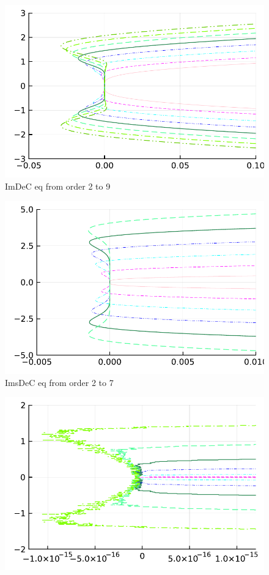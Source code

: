 \begin{figure}
	\begin{minipage}[t]{0.325\textwidth}
		\includegraphics[width=\textwidth]{pdf/odepics/IMEXDeC_equispaced_zoom.pdf}
		\centering
		ImDeC eq from order 2 to 9
	\end{minipage}
	\begin{minipage}[t]{0.325\textwidth}
		\includegraphics[width=\textwidth,trim={0 0 3 0}, clip]{pdf/odepics/IMEXDeC_subtimesteps_equispaced_zoom.pdf}
		\centering
		ImsDeC eq from order 2 to 7
	\end{minipage}
	\begin{minipage}[t]{0.325\textwidth}
		\includegraphics[width=\textwidth]{pdf/odepics/IMEXADER_equispaced_zoom.pdf}

\end{minipage}
\end{figure}
